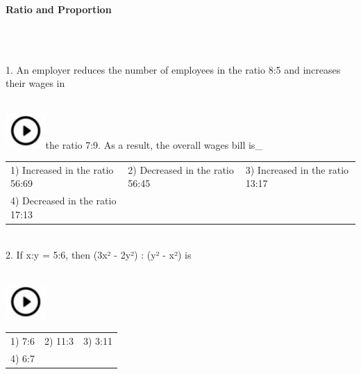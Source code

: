 \documentclass{article}
\begin{document}
	\noindent \begin{center}
		{\Large \textbf{Ratio and Proportion \\}}
	\end{center}
	
	



\noindent \\  

\noindent 

\noindent \\   1.   An employer reduces the number of employees in the ratio 8:5 and increases their wages in

\noindent  
	\noindent \\ \includegraphics*[width=0.60in, height=0.52in]{images/image1}the ratio 7:9. As a result, the overall wages bill is\_

\noindent \begin{tabular}{p{1.7in} p{1.6in} p{1.6in}} \\ 
 1) Increased in the ratio 56:69                    &  2) Decreased in the ratio 56:45

\noindent 

\noindent &  3) Increased in the ratio 13:17                    \\
4) Decreased in the ratio 17:13 \\
\end{tabular}

\noindent 

\noindent 

\noindent 

\noindent \\   2.   If x:y = 5:6, then (3x² - 2y²) : (y² - x²) is

\noindent  
	\noindent \\ \includegraphics*[width=0.60in, height=0.52in]{images/image1}\begin{tabular}{p{1.7in} p{1.6in} p{1.6in}} \\ 
 1) 7:6                       &  2) 11:3              &  3) 3:11               \\
4) 6:7 \\
\end{tabular}
\end{document}
